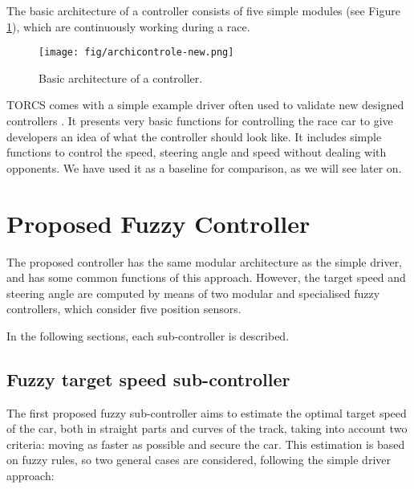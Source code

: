 \documentclass[runningheads,a4paper]{llncs}
\begin{document}
	The basic architecture of a controller consists of five simple modules (see Figure \ref{archi}), which are continuously working during a race. 
	
	\begin{figure}
		
		\centering
		\texttt{[image: fig/archicontrole-new.png]}
		\begin{minipage}{10cm}
			\centering
			\caption{\footnotesize Basic architecture of a controller.}
			\label{archi}
		\end{minipage} 	
	\end{figure}
	
	TORCS comes with a simple example driver often used to validate new
	designed controllers \cite{CarRacing_Pelta09,torcs2}. It presents very basic
	functions for controlling the race car to give developers an idea of
	what the controller should look like. It includes simple functions to
	control the speed, steering angle and speed without dealing with
	opponents. We have used it as a baseline for comparison, as we will
	see later on.
	
	
	\section{Proposed Fuzzy Controller}
	\label{sec:fuzzy_controller}
	
	The proposed controller has the same modular architecture as the simple driver, and has some common functions of this approach. 
	However, the target speed and steering angle are computed by means of two modular and specialised fuzzy controllers, which consider five position sensors.
	
	In the following sections, each sub-controller is described.
	
	
	\subsection{Fuzzy target speed sub-controller}
	
	The first proposed fuzzy sub-controller aims to estimate the optimal target speed of the car, both in straight parts and curves of the track, taking into account two criteria: moving as faster as possible and secure the car. This estimation is based on fuzzy rules, so two general cases are considered, following the simple driver approach:
	
\end{document}
